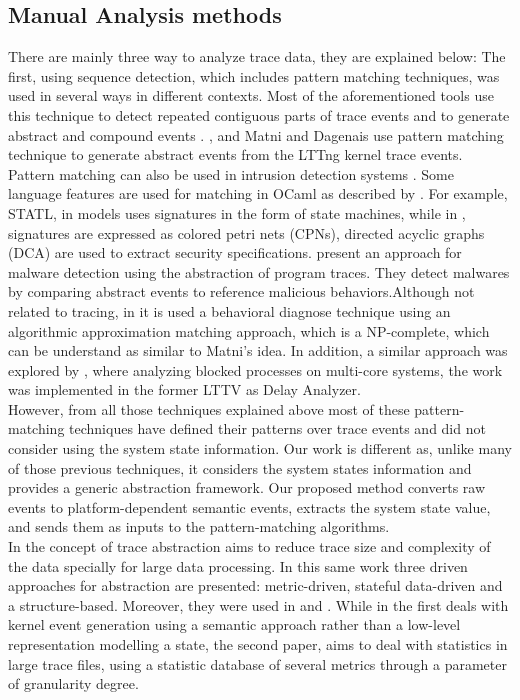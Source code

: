 \subsection{Manual Analysis methods}
There are mainly three way to analyze trace data, they are explained below:
The first, using sequence detection, which includes pattern matching techniques, was used in several ways in different contexts. Most of the aforementioned tools use this technique to detect repeated contiguous parts of trace events and to generate abstract and compound events \cite{Pinpoint}. \cite{Fadel}, and Matni and Dagenais \cite{matni} use pattern matching technique to generate abstract events from the LTTng kernel trace events. Pattern matching can also be used in intrusion detection systems \cite{pattern_matching_intrusion}. Some language features are used for matching in OCaml as described by \cite{ocaml}.
For example, STATL, in \cite{statl} models uses signatures in the form of state machines, while in \cite{tracecompass}, signatures are expressed as colored petri nets (CPNs), directed acyclic graphs (DCA) are used to extract security specifications. \cite{behavior_abstraction} present an approach for malware detection using the abstraction of program traces. They detect malwares by comparing abstract events to reference malicious behaviors.Although not related to tracing, in \cite{Fredrikson2011} it is used a behavioral diagnose technique using an algorithmic approximation matching approach, which is a NP-complete, which can be understand as similar to Matni's idea. In addition, a similar approach was explored by \cite{Fournier}, where analyzing blocked processes on multi-core systems, the work was implemented in the former LTTV as Delay Analyzer.\\
However, from all those techniques explained above most of these pattern-matching techniques have defined their patterns over trace events and did not consider using the system state information. Our work is different as, unlike many of those previous techniques, it considers the system states information and provides a generic abstraction framework. Our proposed method converts raw events to platform-dependent semantic events, extracts the system state value, and sends them as inputs to the pattern-matching algorithms.\\
In \cite{naser_abstraction} the concept of trace abstraction aims to reduce trace size and complexity of the data specially for large data processing. In this same work three driven approaches for abstraction are presented: metric-driven, stateful data-driven and a structure-based. Moreover, they were used in \cite{trace_abstraction_1} and \cite{trace_abstraction_2}. While in the first deals with kernel event generation using a semantic approach rather than a low-level representation modelling a state, the second paper, aims to deal with statistics in large trace files, using a statistic database of several metrics through a parameter of granularity degree. \\
